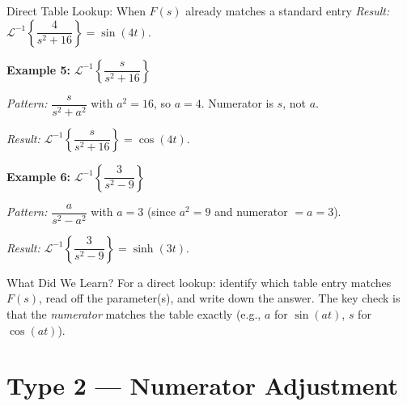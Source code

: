 \documentclass[12pt,a4paper]{article}
\begin{document}
\begin{infobox}{Direct Table Lookup: When $F(s)$ already matches a standard entry}
\textit{Result:} $\mathcal{L}^{-1}\left\{\dfrac{4}{s^2+16}\right\} = \sin(4t)$.

\medskip
\textbf{Example 5:} $\mathcal{L}^{-1}\left\{\dfrac{s}{s^2+16}\right\}$

\textit{Pattern:} $\dfrac{s}{s^2+a^2}$ with $a^2 = 16$, so $a = 4$. Numerator is $s$, not $a$.

\textit{Result:} $\mathcal{L}^{-1}\left\{\dfrac{s}{s^2+16}\right\} = \cos(4t)$.

\medskip
\textbf{Example 6:} $\mathcal{L}^{-1}\left\{\dfrac{3}{s^2-9}\right\}$

\textit{Pattern:} $\dfrac{a}{s^2-a^2}$ with $a = 3$ (since $a^2 = 9$ and numerator $= a = 3$).

\textit{Result:} $\mathcal{L}^{-1}\left\{\dfrac{3}{s^2-9}\right\} = \sinh(3t)$.
\end{infobox}

\begin{learnbox}{What Did We Learn?}
For a direct lookup: identify which table entry matches $F(s)$, read off the parameter(s),
and write down the answer. The key check is that the \emph{numerator} matches the table
exactly (e.g., $a$ for $\sin(at)$, $s$ for $\cos(at)$).
\end{learnbox}

\section{Type 2 --- Numerator Adjustment}
\end{document}
